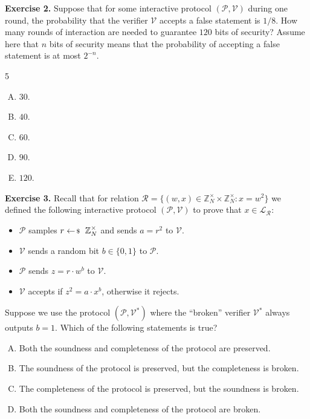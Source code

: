 \documentclass[../../book.tex]{subfiles}
\begin{document}
\textbf{Exercise 2.} Suppose that for some interactive protocol $(\mathcal{P},
\mathcal{V})$ during one round, the probability that the verifier $\mathcal{V}$
accepts a false statement is $1/8$. How many rounds of interaction are needed to
guarantee $120$ bits of security? Assume here that $n$ bits of security means
that the probability of accepting a false statement is at most $2^{-n}$.
\begin{multicols}{5}    
    \begin{enumerate}[(A)]
        \item $30$.
        \item $40$.
        \item $60$.
        \item $90$.
        \item $120$.
    \end{enumerate}
\end{multicols}

\textbf{Exercise 3.} Recall that for relation $\mathcal{R} = \{(w,x) \in
\mathbb{Z}_N^{\times} \times \mathbb{Z}_N^{\times}: x = w^2\}$ we defined the
following interactive protocol $(\mathcal{P}, \mathcal{V})$ to prove that $x \in
\mathcal{L}_{\mathcal{R}}$:
\begin{itemize}
    \item $\mathcal{P}$ samples $r \leftarrowS \mathbb{Z}_N^{\times}$ and sends $a = r^2$ to $\mathcal{V}$.
    \item $\mathcal{V}$ sends a random bit $b \in \{0,1\}$ to $\mathcal{P}$.
    \item $\mathcal{P}$ sends $z = r \cdot w^b$ to $\mathcal{V}$.
    \item $\mathcal{V}$ accepts if $z^2 = a \cdot x^b$, otherwise it rejects.
\end{itemize}

Suppose we use the protocol $(\mathcal{P}, \mathcal{V}^*)$ where the ``broken'' verifier $\mathcal{V}^*$ always outputs $b=1$. Which of the following statements is true?
\begin{enumerate}[(A)]
    \item Both the soundness and completeness of the protocol are preserved.
    \item The soundness of the protocol is preserved, but the completeness is broken.
    \item The completeness of the protocol is preserved, but the soundness is broken.
    \item Both the soundness and completeness of the protocol are broken.
\end{enumerate}
\end{document}
